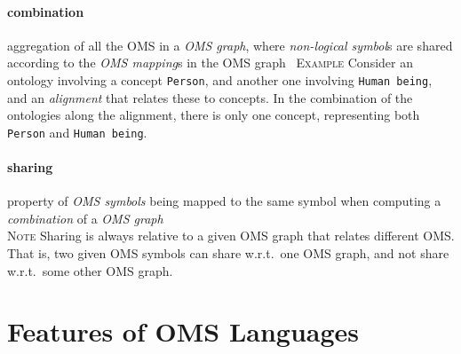 \documentclass[10pt,%
\ifpretendfinal
final%
\else
draft%
\fi,
]{scrreprt}
\newcommand*{\termref}[1]{\textit{#1}}
\newcommand{\sclause}[1]{\section{#1}}
\newcommand{\termdefinition}[2]{\paragraph{#1} #2}
\newenvironment{definitions}[0]{\medskip }{}
\newenvironment{note}[0]{\ \\ \textsc{Note} \quad}{}
\newenvironment{example}[0]{\ \newline \textsc{Example}\quad }{}
\begin{document}
\begin{definitions}
  \termdefinition{combination}{aggregation of all the OMS in a \termref{OMS graph}, where \termref{non-logical symbol}s are shared according to the \termref{OMS mapping}s in the OMS graph}
\begin{example}
Consider an ontology involving a concept \texttt{Person},
and another one involving \texttt{Human being}, and an \termref{alignment}
that relates these to concepts. In the combination of the ontologies
along the alignment, there is only one concept, representing both
\texttt{Person} and \texttt{Human being}.
\end{example}

 
  \termdefinition{sharing}{property of \termref{OMS symbols} being mapped to the same symbol when computing a \termref{combination} of a \termref{OMS graph}}
 \begin{note}
  Sharing is always relative to a given OMS graph that
  relates different OMS. That is, two given OMS symbols
  can share w.r.t.\ one OMS graph, and not share w.r.t.\ some
  other OMS graph.
 \end{note}

\end{definitions}

\sclause{Features of OMS Languages}
 
\end{document}
